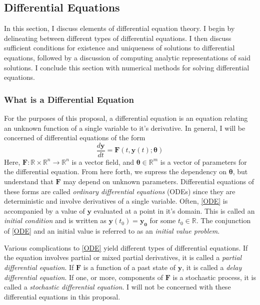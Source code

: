 \subsection{Differential Equations}

In this section, I discuss elements of differential equation theory.  I begin by delineating between different types of differential equations.  I then discuss sufficient conditions for existence and uniqueness of solutions to differential equations, followed by a discussion of computing analytic representations of said solutions.  I conclude this section with numerical methods for solving differential equations.

\subsubsection{What is a Differential Equation}

For the purposes of this proposal, a differential equation is an equation relating an unknown function of a single variable to it's derivative. In general, I will be concerned of differential equations of the form
%
\begin{equation}\label{ODE}
\dfrac{d \mathbf{y}}{dt}  = \mathbf{F}(t,\mathbf{y}(t);\bm{\theta})
\end{equation}
%
Here, $ \mathbf{F} : \mathbb{R} \times \mathbb{R}^n \rightarrow \mathbb{R}^n $ is a vector field, and $ \bm{\theta} \in \mathbb{R}^m $ is a vector of parameters for the differential equation.  From here forth, we supress the dependency on $ \bm{\theta} $, but understand that $ \mathbf{F} $ may depend on unknown parameters. Differential equations of these forms are called \textit{ordinary differential equations} (ODEs) since they are deterministic and involve derivatives of a single variable.  Often, \cref{ODE} is accompanied by a value of $ \mathbf{y} $  evaluated at a point in it's domain.  This is called an \textit{initial condition} and is written as $ \mathbf{y}(t_0) = \mathbf{y_0} $ for some $ t_0 \in \mathbb{R}$.  The conjunction of \cref{ODE} and an initial value is referred to as an \textit{initial value problem}.

Various complications to \cref{ODE} yield different types of differential equations. If the equation involves partial or mixed partial derivatives, it is called a \textit{partial differential equation}.  If $ \mathbf{F} $ is a function of a past state of $ \mathbf{y} $, it is called a \textit{delay differential equation}.  If one, or more, components of $ \mathbf{F} $ is a stochastic process, it is called a \textit{stochastic differential equation}.  I will not be concerned with these differential equations in this proposal.

